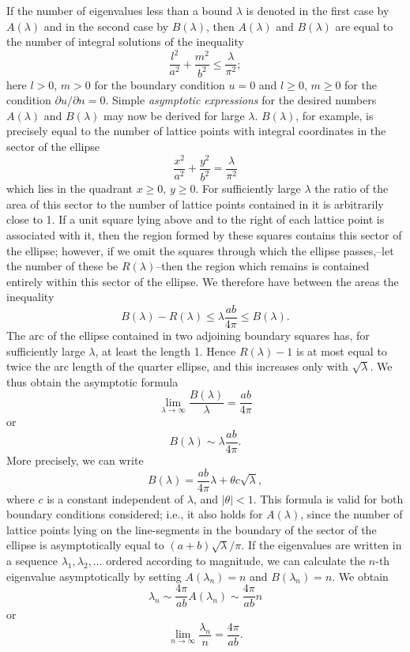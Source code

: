 If the number of eigenvalues less than a bound $\lambda$ is denoted in the first case by $A(\lambda)$ and in the second case by $B(\lambda)$, then $A(\lambda)$ and $B(\lambda)$ are equal to the number of integral solutions of the inequality
\[
\frac{l^2}{a^2}+\frac{m^2}{b^2}\le \frac{\lambda}{\pi^2};
\]
here $l>0$, $m>0$ for the boundary condition $u=0$ and $l\ge0$, $m\ge0$ for the condition $\partial u/\partial n=0$. Simple \emph{asymptotic expressions} for the desired numbers $A(\lambda)$ and $B(\lambda)$ may now be derived for large $\lambda$. $B(\lambda)$, for example, is precisely equal to the number of lattice points with integral coordinates in the sector of the ellipse
\[
\frac{x^2}{a^2}+\frac{y^2}{b^2}=\frac{\lambda}{\pi^2}
\]
which lies in the quadrant $x\ge0$, $y\ge0$. For sufficiently large $\lambda$ the ratio of the area of this sector to the number of lattice points contained in it is arbitrarily close to 1. If a unit square lying above and to the right of each lattice point is associated with it, then the region formed by these squares contains this sector of the ellipse; however, if we omit the squares through which the ellipse passes,--let the number of these be $R(\lambda)$--then the region which remains is contained entirely within this sector of the ellipse. We therefore have between the areas the inequality
\[
B(\lambda)-R(\lambda)\le \lambda\frac{ab}{4\pi}\le B(\lambda).
\]
The arc of the ellipse contained in two adjoining boundary squares has, for sufficiently large $\lambda$, at least the length 1. Hence $R(\lambda)-1$ is at most equal to twice the arc length of the quarter ellipse, and this increases only with $\sqrt\lambda$. We thus obtain the asymptotic formula
\[
\lim_{\lambda\to\infty}\frac{B(\lambda)}{\lambda}=\frac{ab}{4\pi}
\]
or
\[
B(\lambda)\sim\lambda\frac{ab}{4\pi}.
\]
More precisely, we can write
\[
B(\lambda)=\frac{ab}{4\pi}\lambda+\theta c\sqrt\lambda,
\]
where $c$ is a constant independent of $\lambda$, and $|\theta|<1$. This formula is valid for both boundary conditions considered; i.e., it also holds for $A(\lambda)$, since the number of lattice points lying on the line-segments in the boundary of the sector of the ellipse is asymptotically equal to $(a+b)\sqrt\lambda/\pi$. If the eigenvalues are written in a sequence $\lambda_1,\lambda_2,\ldots$ ordered according to magnitude, we can calculate the $n$-th eigenvalue asymptotically by setting $A(\lambda_n)=n$ and $B(\lambda_n)=n$. We obtain
\[
\lambda_n\sim\frac{4\pi}{ab}A(\lambda_n)\sim\frac{4\pi}{ab}n
\]
or
\[
\lim_{n\to\infty}\frac{\lambda_n}{n}=\frac{4\pi}{ab}.
\]

